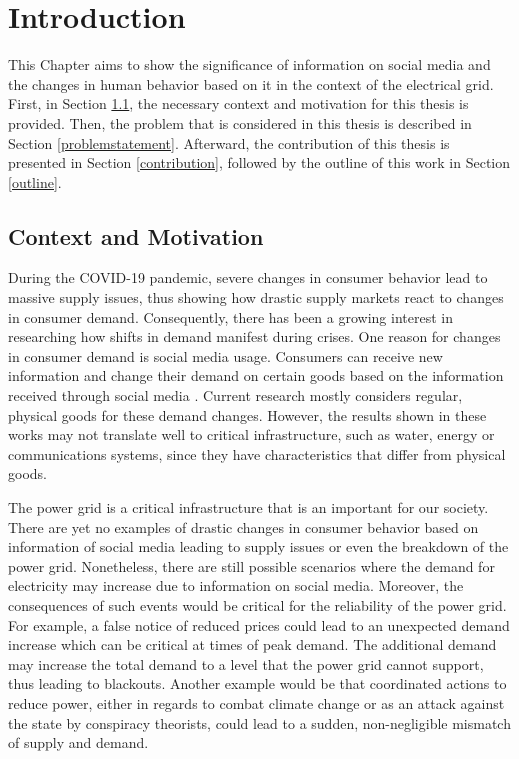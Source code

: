 \chapter{Introduction}

This Chapter aims to show the significance of information on social media and 
the changes in human behavior based on it
in the context of the electrical grid.
First, in Section \ref{contextmotivation}, the necessary context and 
motivation for this thesis is provided.
Then, the problem that is considered in this thesis is described 
in Section \ref{problemstatement}. Afterward, the contribution of this
thesis is presented in Section \ref{contribution}, 
followed by the outline of this work in Section \ref{outline}.

\section{Context and Motivation}
\label{contextmotivation}

During the COVID-19 pandemic, severe changes in consumer behavior
lead to massive supply issues, thus showing how drastic supply markets 
react to changes in consumer demand.
Consequently, there has been a growing interest in researching 
how shifts in demand manifest during crises. 
One reason for changes in consumer demand is 
social media usage. Consumers can receive new information
and change their demand on certain goods based on the information received 
through social media \cite{naeem2021social}.
Current research mostly considers regular, physical 
goods for these demand changes.
However, the results shown in these 
works may not translate well to critical infrastructure,
such as water, energy or communications systems,
since they have characteristics that differ from physical goods.

The power grid is a critical infrastructure 
that is an important for our society.
There are yet no examples of drastic changes in consumer behavior
based on information of social media leading to supply issues or
even the breakdown of the power grid. Nonetheless, 
there are still possible scenarios where the demand for
electricity may increase due to information on social media.
Moreover, the consequences of such events would be critical for the
reliability of the power grid.
For example, a false notice of reduced prices 
could lead to an unexpected demand increase which 
can be critical at times of peak demand. 
The additional demand
may increase the total demand to a level that the power grid
cannot support, thus leading to blackouts.
Another example would be that coordinated actions to reduce
power, either in regards to combat climate change \cite{earthday}
or as an attack against the state by conspiracy theorists,
could lead to a sudden, non-negligible mismatch of supply and demand.


